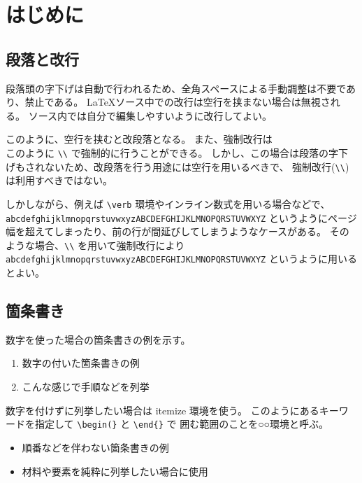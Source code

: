 \chapter{はじめに}
\label{chp:first}

\section{段落と改行}
\label{sec:paragraph}

段落頭の字下げは自動で行われるため、全角スペースによる手動調整は不要であり、禁止である。
\LaTeX ソース中での改行は空行を挟まない場合は無視される。
ソース内では自分で編集しやすいように改行してよい。

このように、空行を挟むと改段落となる。
また、強制改行は\\このように \verb+\\+ で強制的に行うことができる。
しかし、この場合は段落の字下げもされないため、改段落を行う用途には空行を用いるべきで、
強制改行(\verb+\\+)は利用すべきではない。

しかしながら、例えば \verb+\verb+ 環境やインライン数式を用いる場合などで、
\verb+abcdefghijklmnopqrstuvwxyzABCDEFGHIJKLMNOPQRSTUVWXYZ+ 
というようにページ幅を超えてしまったり、前の行が間延びしてしまうようなケースがある。
そのような場合、\verb+\\+ を用いて強制改行により \\
\verb+abcdefghijklmnopqrstuvwxyzABCDEFGHIJKLMNOPQRSTUVWXYZ+ 
というように用いるとよい。

\section{箇条書き}
\label{sec:enum}

数字を使った場合の箇条書きの例を示す。

\begin{enumerate}
 \item 数字の付いた箇条書きの例
 \item こんな感じで手順などを列挙
\end{enumerate}

数字を付けずに列挙したい場合は itemize 環境を使う。
このようにあるキーワードを指定して \verb+\begin(}+ と \verb+\end{}+ で
囲む範囲のことを○○環境と呼ぶ。

\begin{itemize}
 \item 順番などを伴わない箇条書きの例
 \item 材料や要素を純粋に列挙したい場合に使用
\end{itemize}

